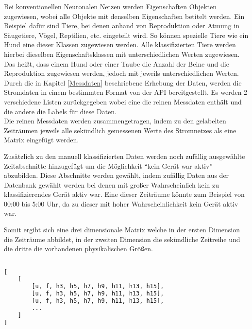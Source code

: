     \noindent
    Bei konventionellen Neuronalen Netzen werden Eigenschaften Objekten zugewiesen, wobei alle Objekte mit denselben Eigenschaften betitelt werden.
    Ein Beispiel dafür sind Tiere, bei denen anhand von Reproduktion oder Atmung in Säugetiere, Vögel, Reptilien, etc. eingeteilt wird. 
    So können spezielle Tiere wie ein Hund eine dieser Klassen zugewiesen werden.
    Alle klassifizierten Tiere werden hierbei dieselben Eigenschaftsklassen mit unterschiedlichen Werten zugewiesen.
    Das heißt, dass einem Hund oder einer Taube die Anzahl der Beine und die Reproduktion zugewiesen werden, jedoch mit jeweils unterschiedlichen Werten.\\
    
    Durch die in Kapitel \ref{Messdaten} beschriebene Erhebung der Daten, werden die Stromdaten in einem bestimmten Format von der API bereitgestellt.
    Es werden 2 verschiedene Listen zurückgegeben wobei eine die reinen Messdaten enthält und die andere die Labels für diese Daten.\\
    Die reinen Messdaten werden zusammengetragen, indem zu den gelabelten Zeiträumen jeweils alle sekündlich gemessenen Werte des Stromnetzes als eine Matrix eingefügt werden.
    \newline

    \noindent
    Zusätzlich zu den manuell klassifizierten Daten werden noch zufällig ausgewählte Zeitabschnitte hinzugefügt um die Möglichkeit "`kein Gerät war aktiv"' abzubilden.
    Diese Abschnitte werden gewählt, indem zufällig Daten aus der Datenbank gewählt werden bei denen mit großer Wahrscheinlich kein zu klassifizierendes Gerät aktiv war.
    Eine dieser Zeiträume könnte zum Beispiel von 00:00 bis 5:00 Uhr, da zu dieser mit hoher Wahrscheinlichkeit kein Gerät aktiv war.
    \newline

    \noindent
    Somit ergibt sich eine drei dimensionale Matrix welche in der ersten Dimension die Zeiträume abbildet, in der zweiten Dimension die sekündliche Zeitreihe und die dritte die vorhandenen physikalischen Größen.

    \begin{lstlisting}[language=Python, caption={Datenstruktur der gelabelten Messdaten, die von der API bereit gestellt wird},label=lst:DatenstrukturGelabelteMessdaten]

[
    [
        [u, f, h3, h5, h7, h9, h11, h13, h15],
        [u, f, h3, h5, h7, h9, h11, h13, h15],
        [u, f, h3, h5, h7, h9, h11, h13, h15],
        ...
    ]
]
    \end{lstlisting}

